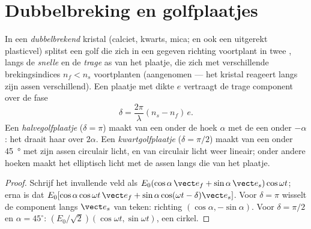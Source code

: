 \section{Dubbelbreking en golfplaatjes}

\begin{proposition}[Golfplaatjes]\label{prop:b2:plane-waves-polarization:plates}
In een \emph{dubbelbrekend} kristal (calciet, kwarts, mica; en ook een
uitgerekt plasticvel) splitst een golf die zich in een gegeven richting
voortplant in twee , langs de \emph{snelle} en de
\emph{trage} as van het plaatje, die zich met verschillende brekingsindices
$n_f <
n_s$ voortplanten (aangenomen --- het kristal reageert langs zijn
assen verschillend). Een plaatje met dikte $e$ vertraagt de trage component
over de fase
\[
\delta = \frac{2\pi}\lambda(n_s - n_f)\,e .
\]
Een \emph{halvegolfplaatje} ($\delta = \pi$) maakt van een  onder de hoek $\alpha$ met de  een 
onder $-\alpha$: het draait haar over $2\alpha$. Een \emph{kwartgolfplaatje}
($\delta = \pi/2$) maakt van een  onder
\qty{45}{\degree} met zijn assen circulair licht, en van circulair licht
weer lineair; onder andere hoeken maakt het elliptisch licht met de assen
langs die van het plaatje.
\end{proposition}

\begin{proof}
Schrijf het invallende veld als
$E_0(\cos\alpha\,\vect e_f + \sin\alpha\,\vect e_s)\cos\omega t$; erna is dat
$E_0[\cos\alpha\cos\omega t\,\vect e_f + \sin\alpha\cos(\omega t - \delta)
\vect e_s]$.
Voor $\delta = \pi$ wisselt de component langs $\vect e_s$ van teken:
richting $(\cos\alpha, -\sin\alpha)$. Voor $\delta = \pi/2$ en
$\alpha = 45^\circ$: $(E_0/\sqrt2)(\cos
\omega t, \sin\omega t)$, een
cirkel.
\end{proof}

